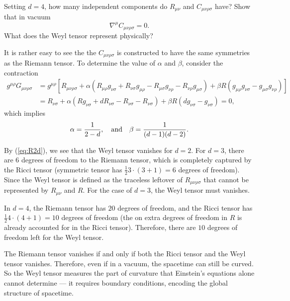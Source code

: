 Setting $d=4$, how many independent components do $R_{\mu\nu}$ and $C_{\mu\nu\rho\sigma}$ have? Show that in vacuum
\begin{equation}
    \nabla^\mu C_{\mu\nu\rho\sigma} = 0.
\end{equation}
What does the Weyl tensor represent physically?
\begin{solution}
    It is rather easy to see the the $C_{\mu\nu\rho\sigma}$ is constructed to have the same symmetries as the Riemann tensor. To determine the value of $\alpha$ and $\beta$, consider the contraction
    \begin{equation}
    \begin{aligned}
        g^{\mu\rho}G_{\mu\nu\rho\sigma} &= g^{\mu\rho}\left[R_{\mu\nu\rho\sigma} + \alpha(R_{\mu\rho}g_{\nu\sigma} + R_{\nu\sigma}g_{\mu\rho} - R_{\mu\sigma}g_{\nu\rho} - R_{\nu\rho}g_{\mu\sigma}) + \beta R(g_{\mu\rho}g_{\nu\sigma} - g_{\mu\sigma}g_{\nu\rho})\right]\\
        &=R_{\nu\sigma} + \alpha(Rg_{\nu\sigma}+dR_{\nu\sigma}-R_{\nu\sigma} - R_{\nu\sigma}) + \beta R(dg_{\nu\sigma} - g_{\nu\sigma})= 0,
    \end{aligned}
    \end{equation}
    which implies
    \begin{equation}
        \alpha = \frac{1}{2-d}, \quad {\rm and} \quad \beta = \frac{1}{(d-1)(d-2)}.
    \end{equation}

    By (\ref{eq:R2d}), we see that the Weyl tensor vanishes for $d=2$. For $d=3$, there are 6 degrees of freedom to the Riemann tensor, which is completely captured by the Ricci tensor (symmetric tensor has $\tfrac{1}{2}3\cdot(3+1)= 6$ degrees of freedom). Since the Weyl tensor is defined as the traceless leftover of $R_{\mu\nu\rho\sigma}$ that cannot be represented by $R_{\mu\nu}$ and $R$. For the case of $d=3$, the Weyl tensor must vanishes.

    In $d=4$, the Riemann tensor has $20$ degrees of freedom, and the Ricci tensor has $\tfrac{1}{2}4\cdot  (4+1) = 10$ degrees of freedom (the on extra degrees of freedom in $R$ is already accounted for in the Ricci tensor). Therefore, there are $10$ degrees of freedom left for the Weyl tensor.

    The Riemann tensor vanishes if and only if both the Ricci tensor and the Weyl tensor vanishes. Therefore, even if in a vacuum, the spacetime can still be curved. So the Weyl tensor measures the part of curvature that Einstein's equations alone cannot determine — it requires boundary conditions, encoding the global structure of spacetime.
\end{solution}


